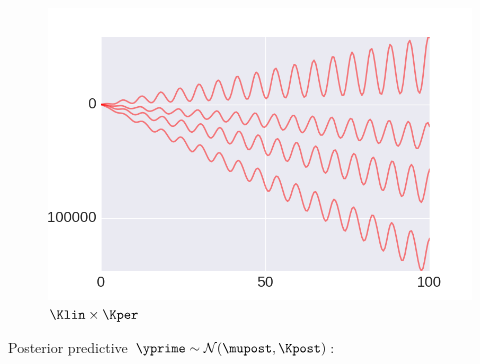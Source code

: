     \begin{subfigure}[b]{0.3\textwidth}
        \includegraphics[width=\textwidth]{figs/composition/composition_demo_LINxPER_prior.png}
        \caption{$\Klin \times \Kper$}
    \end{subfigure} \vspace{4mm} 

Posterior predictive $\yprime \sim \mathcal{N}(\mupost,\Kpost)$:

